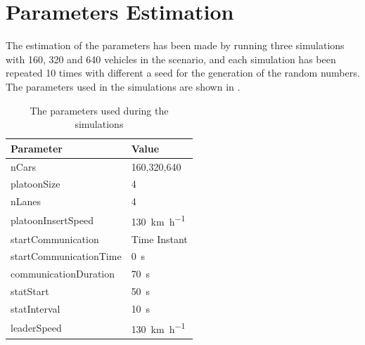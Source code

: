 \section{Parameters Estimation}
\label{sec:estimation}
The estimation of the parameters has been made by running three simulations with 160, 320 and 640 vehicles in the scenario, and each simulation has been repeated 10 times with different a seed for the generation of the random numbers. The parameters used in the simulations are shown in .
\begin{table}[H]
    \centering
    {\tabulinesep=1.2mm
    \begin{tabu}{l|l}
        \hline
        Parameter & Value  \\
        \hline
        nCars & 160,320,640    \\
        platoonSize & 4 \\
        nLanes  & 4 \\
        platoonInsertSpeed& \SI{130}{\km\per\hour} \\
        startCommunication & Time Instant \\
        startCommunicationTime & \SI{0}{\s}\\
        communicationDuration & \SI{70}{\s}\\
        statStart & \SI{50}{\s}\\
        statInterval & \SI{10}{\s}\\
        leaderSpeed & \SI{130}{\km\per\hour} \\
        \hline
    \end{tabu}}
    \caption{The parameters used during the simulations}
    \label{tab:param_simulations}
\end{table}


